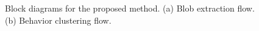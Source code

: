 \begin{figure}[t]
  \caption[Block diagrams for the proposed method.]{\small Block
    diagrams for the proposed method.  (a) Blob extraction flow. (b)
    Behavior clustering flow.}
  \label{fig:overview-blob-diagram}
\end{figure}

